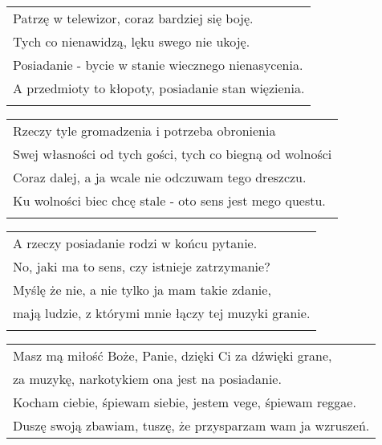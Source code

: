 \documentclass[a5paper]{article}
\begin{document}
\noindent
\begin{tabular}{@{}p{12cm}@{}}
Patrzę w telewizor, coraz bardziej się boję. \\
Tych co nienawidzą, lęku swego nie ukoję. \\
Posiadanie - bycie w stanie wiecznego nienasycenia. \\
A przedmioty to kłopoty, posiadanie stan więzienia. \\ \\
\end{tabular}

\noindent
\begin{tabular}{@{}p{12cm}@{}}
Rzeczy tyle gromadzenia i potrzeba obronienia \\
Swej własności od tych gości, tych co biegną od wolności \\
Coraz dalej, a ja wcale nie odczuwam tego dreszczu. \\
Ku wolności biec chcę stale - oto sens jest mego questu. \\ \\
\end{tabular}

\noindent
\begin{tabular}{@{}p{12cm}@{}}
A rzeczy posiadanie rodzi w końcu pytanie. \\
No, jaki ma to sens, czy istnieje zatrzymanie? \\
Myślę że nie, a nie tylko ja mam takie zdanie, \\
mają ludzie, z którymi mnie łączy tej muzyki granie. \\ \\
\end{tabular}

\noindent
\begin{tabular}{@{}p{12cm}@{}}
Masz mą miłość Boże, Panie, dzięki Ci za dźwięki grane, \\
za muzykę, narkotykiem ona jest na posiadanie. \\
Kocham ciebie, śpiewam siebie, jestem vege, śpiewam reggae. \\
Duszę swoją zbawiam, tuszę, że przysparzam wam ja wzruszeń.
\end{tabular}
\end{document}
